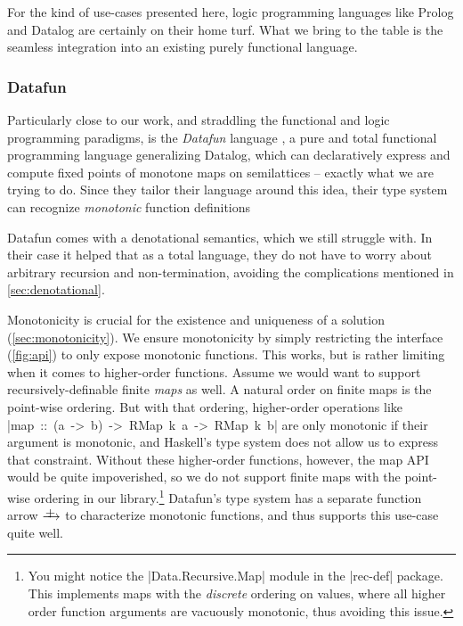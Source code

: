 \documentclass[manuscript,screen,acmsmall,nonacm]{acmart}
\begin{document}
For the kind of use-cases presented here, logic programming languages like Prolog and Datalog are certainly on their home turf. What we bring to the table is the seamless integration into an existing purely functional language.

\subsubsection{Datafun}

Particularly close to our work, and straddling the functional and logic programming paradigms, is the \emph{Datafun} language \citep{datafun}, a pure and total functional programming language generalizing Datalog, which can declaratively express and compute fixed points of monotone maps on semilattices -- exactly what we are trying to do. Since they tailor their language around this idea, their type system can recognize \emph{monotonic} function definitions

Datafun comes with a denotational semantics, which we still struggle with. In their case it helped that as a total language, they do not have to worry about arbitrary recursion and non-termination, avoiding the complications mentioned in \cref{sec:denotational}.

\newcommand{\mfun}{\xrightarrow{\raisebox{-3pt}[0pt][0pt]{+}}}

Monotonicity is crucial for the existence and uniqueness of a solution (\cref{sec:monotonicity}). We ensure monotonicity by simply restricting the interface (\cref{fig:api}) to only expose monotonic functions. This works, but is rather limiting when it comes to higher-order functions. Assume we would want to support recursively-definable finite \emph{maps} as well. A natural order on finite maps is the point-wise ordering. But with that ordering, higher-order operations like \mbox{|map :: (a -> b) -> RMap k a -> RMap k b|} are only monotonic if their argument is monotonic, and Haskell's type system does not allow us to express that constraint. Without these higher-order functions, however, the map API would be quite impoverished, so we do not support finite maps with the point-wise ordering in our library.\footnote{You might notice the |Data.Recursive.Map| module in the |rec-def| package. This implements maps with the \emph{discrete} ordering on values, where all higher order function arguments are vacuously monotonic, thus avoiding this issue.} Datafun's type system has a separate function arrow $\mfun$ to characterize monotonic functions, and thus supports this use-case quite well.
\end{document}
